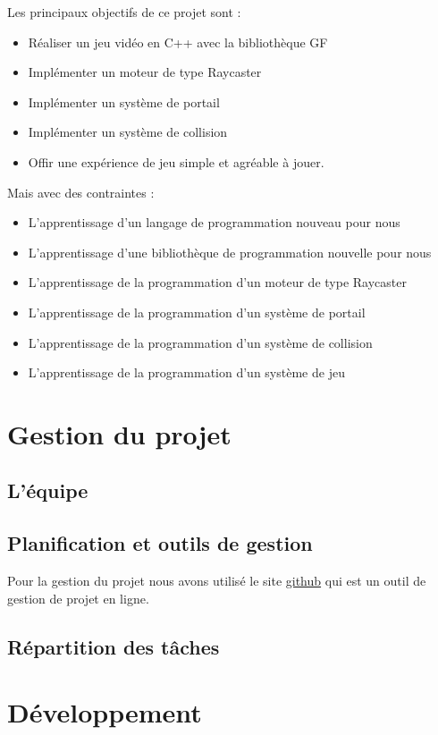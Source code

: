 \documentclass[12pt]{report}
\begin{document}
Les principaux objectifs de ce projet sont :
\begin{itemize}
	\item Réaliser un jeu vidéo en C++ avec la bibliothèque GF
	\item Implémenter un moteur de type Raycaster
	\item Implémenter un système de portail
	\item Implémenter un système de collision
	\item Offir une expérience de jeu simple et agréable à jouer.
\end{itemize}

Mais avec des contraintes :
\begin{itemize}
	\item L'apprentissage d'un langage de programmation nouveau pour nous
	\item L'apprentissage d'une bibliothèque de programmation nouvelle pour nous
	\item L'apprentissage de la programmation d'un moteur de type Raycaster
	\item L'apprentissage de la programmation d'un système de portail
	\item L'apprentissage de la programmation d'un système de collision
	\item L'apprentissage de la programmation d'un système de jeu
\end{itemize}

\section{Gestion du projet}
\subsection{L'équipe}
\subsection{Planification et outils de gestion}

Pour la gestion du projet nous avons utilisé le site 
\href{https://github.com/}{github} qui est un outil de gestion 
de projet en ligne.

\subsection{Répartition des tâches}

\section{Développement}
\end{document}
